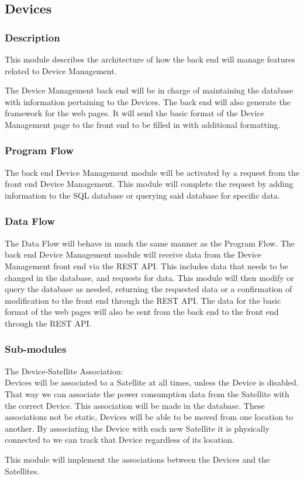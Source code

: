 
\subsection{Devices}

\subsubsection{Description}

This module describes the architecture of how the back end will manage features related to Device Management. 

The Device Management back end will be in charge of maintaining the database with information pertaining to the Devices. 
The back end will also generate the framework for the web pages. 
It will send the basic format of the Device Management page to the front end to be filled in with additional formatting. 
 

\subsubsection{Program Flow}

The back end Device Management module will be activated by a request from the front end Device Management. 
This module will complete the request by adding information to the \ac{SQL} database or querying said database for specific data. 

\subsubsection{Data Flow}

The Data Flow will behave in much the same manner as the Program Flow. 
The back end Device Management module will receive data from the Device Management front end via the \ac{REST} \ac{API}. 
This includes data that needs to be changed in the database, and requests for data. 
This module will then modify or query the database as needed, 
returning the requested data or a confirmation of modification to the front end through the \ac{REST} \ac{API}. 
The data for the basic format of the web pages will also be sent from the back end to the front end through the \ac{REST} \ac{API}. 

\subsubsection{Sub-modules}
The Device-Satellite Association: \\
Devices will be associated to a Satellite at all times, unless the Device is disabled. 
That way we can associate the power consumption data from the Satellite with the correct Device. 
This association will be made in the database. 
These associations not be static, Devices will be able to be moved from one location to another. 
By associating the Device with each new Satellite it is physically connected to we can track that Device regardless of its location. 

This module will implement the associations between the Devices and the Satellites. 